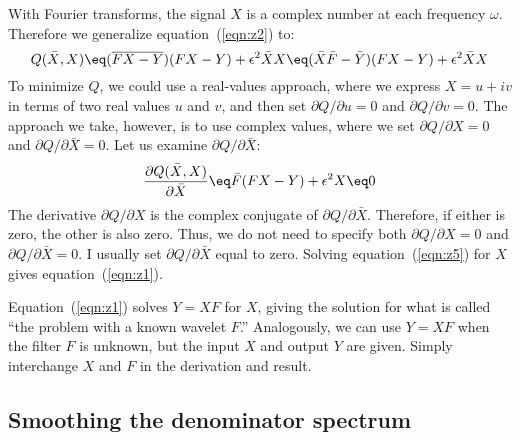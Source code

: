 \par
With Fourier transforms,
the signal $X$ is a complex number at each frequency $\omega$.
Therefore we generalize equation~(\ref{eqn:z2}) to:
\begin{equation}
Q(\bar X, X) \eq
(\overline{FX-Y})        (FX-Y) + \epsilon^2 \bar X X \eq
(\bar X \bar F - \bar Y) (FX-Y) + \epsilon^2 \bar X X
\label{eqn:z4}
\end{equation}
To minimize $Q$, we could use a real-values approach,
where we express
$X=u+iv$ in terms of two real values $u$ and $v$,
and then set $\partial Q/\partial u=0$ and $\partial Q/\partial v=0$.
The approach we take, however,
is to use complex values,
where we set
$\partial Q/\partial X=0$ and $\partial Q/\partial \bar X=0$.
Let us examine $\partial Q/\partial \bar X$:
\begin{equation}
{\partial Q(\bar X, X)\over \partial  \bar X}  \eq
\bar F (FX-Y) + \epsilon^2  X  \eq 0
\label{eqn:z5}
\end{equation}
The derivative $\partial Q/\partial X$ is
the complex conjugate of $\partial Q/\partial \bar X$.
Therefore, if either is zero, the other is also zero.
Thus, we do not need to specify both
$\partial Q/\partial X=0$ and $\partial Q/\partial \bar X=0$.
I usually set
$\partial Q/\partial \bar X$ equal to zero.
Solving equation~(\ref{eqn:z5}) for $X$
gives equation~(\ref{eqn:z1}).

\par
Equation~(\ref{eqn:z1}) solves $Y=XF$ for $X$,
giving the solution for what is called
``the  problem with a known wavelet $F$.''
Analogously, we can use $Y=XF$ when the filter $F$ is unknown,
but the input $X$ and output $Y$ are given.
Simply interchange $X$ and $F$ in the derivation and result.

\subsection{Smoothing the denominator spectrum}


